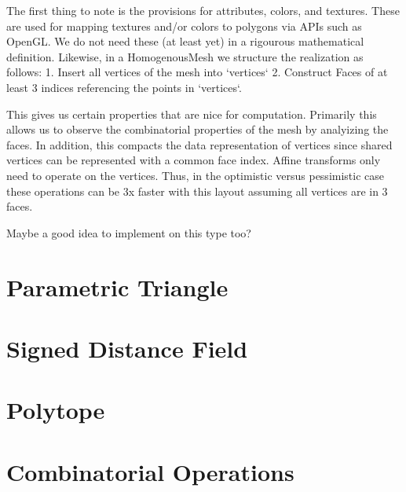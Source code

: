 The first thing to note is the provisions for attributes, colors, and textures.
These are used for mapping textures and/or colors to polygons via APIs such as
OpenGL. We do not need these (at least yet) in a rigourous mathematical
definition. Likewise, in a HomogenousMesh we structure the realization as
follows: 1. Insert all vertices of the mesh into `vertices` 2. Construct
Faces of at least 3 indices referencing the points in `vertices`.

This gives us certain properties that are nice for computation. Primarily
this allows us to observe the combinatorial properties of the mesh by analyizing
the faces. In addition, this compacts the data representation of vertices
since shared vertices can be represented with a common face index. Affine
transforms only need to operate on the vertices. Thus, in the optimistic versus
pessimistic case these operations can be 3x faster with this layout
assuming all vertices are in 3 faces.

Maybe a good idea to implement on this type too?

\section{Parametric Triangle}




\section{Signed Distance Field}


\section{Polytope}


\section{Combinatorial Operations}




